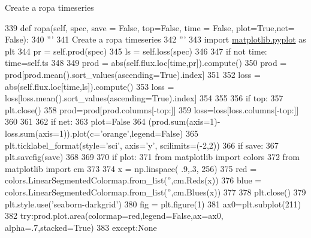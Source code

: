 \begin{DoxyVerb}Create a ropa timeseries
\end{DoxyVerb}
 
\begin{DoxyCode}
339     \textcolor{keyword}{def }ropa(self, spec, save = False, top=False, time = False, plot=True,net= False):
340         \textcolor{stringliteral}{'''}
341 \textcolor{stringliteral}{        Create a ropa timeseries}
342 \textcolor{stringliteral}{        '''}
343         \textcolor{keyword}{import} \mbox{\hyperlink{namespacematplotlib_1_1pyplot}{matplotlib.pyplot}} \textcolor{keyword}{as} plt
344         pr = self.prod(spec)
345         ls = self.loss(spec)
346 
347         \textcolor{keywordflow}{if} \textcolor{keywordflow}{not} time: time=self.ts
348 
349         prod = abs(self.flux.loc[time,pr]).compute()
350         prod = prod[prod.mean().sort\_values(ascending=\textcolor{keyword}{True}).index]
351 
352         loss = abs(self.flux.loc[time,ls]).compute()
353         loss = loss[loss.mean().sort\_values(ascending=\textcolor{keyword}{True}).index]
354 
355 
356         \textcolor{keywordflow}{if} top:
357             plt.close()
358             prod=prod[prod.columns[-top:]]
359             loss=loss[loss.columns[-top:]]
360 
361 
362         \textcolor{keywordflow}{if} net:
363             plot=\textcolor{keyword}{False}
364             (prod.sum(axis=1)-loss.sum(axis=1)).plot(c=\textcolor{stringliteral}{'orange'},legend=\textcolor{keyword}{False})
365             plt.ticklabel\_format(style=\textcolor{stringliteral}{'sci'}, axis=\textcolor{stringliteral}{'y'}, scilimits=(-2,2))
366             \textcolor{keywordflow}{if} save:
367                 plt.savefig(save)
368 
369 
370         \textcolor{keywordflow}{if} plot:
371             \textcolor{keyword}{from} matplotlib \textcolor{keyword}{import} colors
372             \textcolor{keyword}{from} matplotlib \textcolor{keyword}{import} cm
373 
374             x = np.linspace( .9,.3, 256)
375             red = colors.LinearSegmentedColormap.from\_list(\textcolor{stringliteral}{''},cm.Reds(x))
376             blue = colors.LinearSegmentedColormap.from\_list(\textcolor{stringliteral}{''},cm.Blues(x))
377 
378             plt.close()
379             plt.style.use(\textcolor{stringliteral}{'seaborn-darkgrid'})
380             fig = plt.figure(1)
381             ax0=plt.subplot(211)
382             \textcolor{keywordflow}{try}:prod.plot.area(colormap=red,legend=\textcolor{keyword}{False},ax=ax0, alpha=.7,stacked=\textcolor{keyword}{True})
383             \textcolor{keywordflow}{except}:\textcolor{keywordtype}{None}

\end{DoxyCode}

